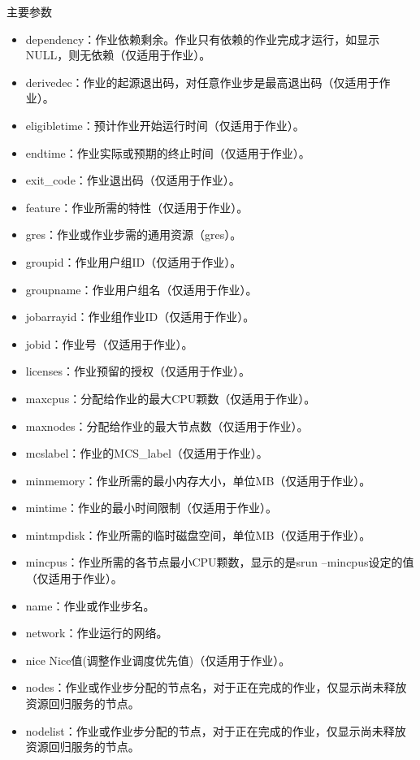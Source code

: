 \begin{frame}[fragile]{主要参数}
\begin{itemize}
\begin{itemize}
\begin{itemize}
    \item dependency：作业依赖剩余。作业只有依赖的作业完成才运行，如显示NULL，则无依赖（仅适用于作业）。
    \item derivedec：作业的起源退出码，对任意作业步是最高退出码（仅适用于作业）。
    \item eligibletime：预计作业开始运行时间（仅适用于作业）。
    \item endtime：作业实际或预期的终止时间（仅适用于作业）。
    \item exit\_code：作业退出码（仅适用于作业）。
    \item feature：作业所需的特性（仅适用于作业）。
    \item gres：作业或作业步需的通用资源（gres）。
    \item groupid：作业用户组ID（仅适用于作业）。
    \item groupname：作业用户组名（仅适用于作业）。
    \item jobarrayid：作业组作业ID（仅适用于作业）。
    \item jobid：作业号（仅适用于作业）。
    \item licenses：作业预留的授权（仅适用于作业）。
    \item maxcpus：分配给作业的最大CPU颗数（仅适用于作业）。
    \item maxnodes：分配给作业的最大节点数（仅适用于作业）。
    \item mcslabel：作业的MCS\_label（仅适用于作业）。
    \item minmemory：作业所需的最小内存大小，单位MB（仅适用于作业）。
    \item mintime：作业的最小时间限制（仅适用于作业）。
    \item mintmpdisk：作业所需的临时磁盘空间，单位MB（仅适用于作业）。
    \item mincpus：作业所需的各节点最小CPU颗数，显示的是srun --mincpus设定的值（仅适用于作业）。
    \item name：作业或作业步名。
    \item network：作业运行的网络。
    \item nice Nice值(调整作业调度优先值)（仅适用于作业）。
    \item nodes：作业或作业步分配的节点名，对于正在完成的作业，仅显示尚未释放资源回归服务的节点。
    \item nodelist：作业或作业步分配的节点，对于正在完成的作业，仅显示尚未释放资源回归服务的节点。

\end{itemize}
\end{itemize}
\end{itemize}
\end{frame}
